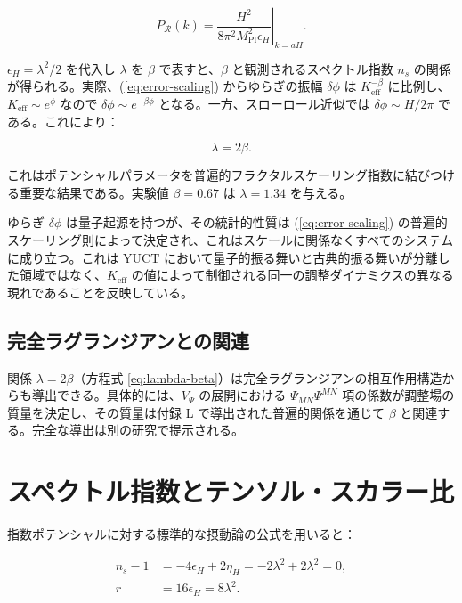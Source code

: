 \documentclass[11pt,a4paper]{article}
\theoremstyle{remark}
\newcommand{\Keff}{K_{\mathrm{eff}}}
\newcommand{\Mpl}{M_{\mathrm{Pl}}}
\newcommand{\rs}{r}
\begin{document}
	\begin{equation}
		P_{\mathcal{R}}(k) = \left. \frac{H^2}{8\pi^2 \Mpl^2 \epsilon_H} \right|_{k=aH}.
	\end{equation}
	
	$\epsilon_H = \lambda^2/2$ を代入し $\lambda$ を $\beta$ で表すと、$\beta$ と観測されるスペクトル指数 $n_s$ の関係が得られる。実際、(\ref{eq:error-scaling}) からゆらぎの振幅 $\delta \phi$ は $\Keff^{-\beta}$ に比例し、$\Keff \sim e^{\phi}$ なので $\delta \phi \sim e^{-\beta \phi}$ となる。一方、スローロール近似では $\delta \phi \sim H/2\pi$ である。これにより：
	
	\begin{equation}
		\lambda = 2\beta.
		\label{eq:lambda-beta}
	\end{equation}
	
	これはポテンシャルパラメータを普遍的フラクタルスケーリング指数に結びつける重要な結果である。実験値 $\beta = 0.67$ は $\lambda = 1.34$ を与える。
	
	ゆらぎ $\delta\phi$ は量子起源を持つが、その統計的性質は (\ref{eq:error-scaling}) の普遍的スケーリング則によって決定され、これはスケールに関係なくすべてのシステムに成り立つ。これは YUCT において量子的振る舞いと古典的振る舞いが分離した領域ではなく、$K_{\mathrm{eff}}$ の値によって制御される同一の調整ダイナミクスの異なる現れであることを反映している。
	
	\subsection{完全ラグランジアンとの関連}
	
	関係 $\lambda = 2\beta$（方程式 \ref{eq:lambda-beta}）は完全ラグランジアンの相互作用構造からも導出できる。具体的には、$V_{\Psi}$ の展開における $\Psi_{MN}\Psi^{MN}$ 項の係数が調整場の質量を決定し、その質量は付録 L で導出された普遍的関係を通じて $\beta$ と関連する。完全な導出は別の研究で提示される。
	
	\section{スペクトル指数とテンソル・スカラー比}
	\label{sec:predictions}
	
	指数ポテンシャルに対する標準的な摂動論の公式を用いると：
	
	\begin{align}
		n_s - 1 &= -4\epsilon_H + 2\eta_H = -2\lambda^2 + 2\lambda^2 = 0, \\
		\rs &= 16\epsilon_H = 8\lambda^2.
	\end{align}
	
\end{document}
